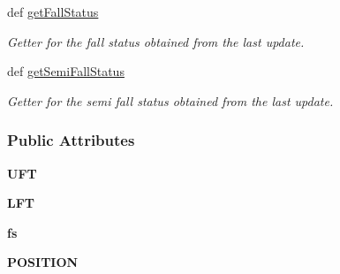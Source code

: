 \begin{DoxyCompactItemize}
def \hyperlink{classfall_detection_1_1_fall_detection_a0563f1d15637964895896b45581bd267}{get\-Fall\-Status}
\begin{DoxyCompactList}\small\item\em Getter for the fall status obtained from the last update. \end{DoxyCompactList}\item 
def \hyperlink{classfall_detection_1_1_fall_detection_aa9bad5034e22fa59b7f54f66c9d3c042}{get\-Semi\-Fall\-Status}
\begin{DoxyCompactList}\small\item\em Getter for the semi fall status obtained from the last update. \end{DoxyCompactList}\end{DoxyCompactItemize}
\subsubsection*{Public Attributes}
\begin{DoxyCompactItemize}
\item 
\hypertarget{classfall_detection_1_1_fall_detection_a957affda8f3d78b80055b7ca0b3b3e48}{{\bfseries U\-F\-T}}\label{classfall_detection_1_1_fall_detection_a957affda8f3d78b80055b7ca0b3b3e48}

\item 
\hypertarget{classfall_detection_1_1_fall_detection_a7a7839c4cad6c984c0b4086f1633bc13}{{\bfseries L\-F\-T}}\label{classfall_detection_1_1_fall_detection_a7a7839c4cad6c984c0b4086f1633bc13}

\item 
\hypertarget{classfall_detection_1_1_fall_detection_a8211460c1e22f409e204e4dd9e5843c0}{{\bfseries fs}}\label{classfall_detection_1_1_fall_detection_a8211460c1e22f409e204e4dd9e5843c0}

\item 
\hypertarget{classfall_detection_1_1_fall_detection_a9c34ba457d991bc7d1bdafe95eb1d2d8}{{\bfseries P\-O\-S\-I\-T\-I\-O\-N}}\label{classfall_detection_1_1_fall_detection_a9c34ba457d991bc7d1bdafe95eb1d2d8}

\end{DoxyCompactItemize}
